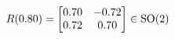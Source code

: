 \documentclass[preview]{standalone}
\begin{document}
\begin{align*}
\special{dvisvgm:raw <g id='unique000'>}R(0.80) = \begin{bmatrix} 0.70 & -0.72 \\ 0.72 & 0.70 \end{bmatrix} \in \text{SO}(2)\special{dvisvgm:raw </g>}
\end{align*}
\end{document}
